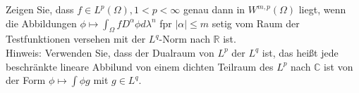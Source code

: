 Zeigen Sie, dass $f \in L^p(\Omega), 1 < p < \infty$ genau dann in $W^{m,p}(\Omega)$ liegt, wenn die Abbildungen
$\phi \mapsto \int_{\Omega}fD^{\alpha}\phi d\lambda^n$ fpr $|\alpha| \leq m$ setig vom Raum der Testfunktionen versehen mit der $L^q$-Norm nach $\mathbb{R}$ ist.\\
Hinweis: Verwenden Sie, dass der Dualraum von $L^p$ der $L^q$ ist, das heißt jede beschränkte lineare Abbilund von einem dichten Teilraum
des $L^p$ nach $\mathbb{C}$ ist von der Form $\phi \mapsto \int \phi g$ mit $g \in L^q$.